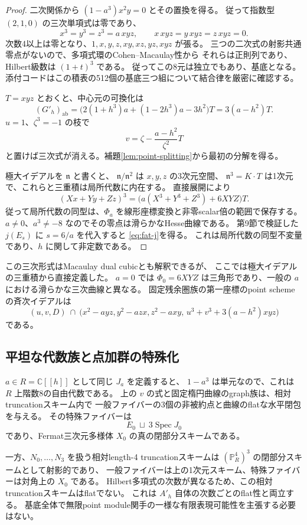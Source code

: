 \documentclass[a4paper,11pt]{ltjsarticle}
\theoremstyle{definition}
\newcommand{\CC}{\mathbb C}
\newcommand{\PP}{\mathbb P}
\begin{document}
\begin{proof}
二次関係から $(1-a^3)x^2y=0$ とその置換を得る。
従って指数型 $(2,1,0)$ の三次単項式は零であり、
\[
 x^3=y^3=z^3=a\,xyz,\qquad
 x\,xyz=y\,xyz=z\,xyz=0.
\]
次数4以上は零となり、$1,x,y,z,xy,xz,yz,xyz$ が張る。
三つの二次式の射影共通零点がないので、多項式環のCohen--Macaulay性から
それらは正則列であり、Hilbert級数は $(1+t)^3$ である。
従ってこの8元は独立でもあり、基底となる。
添付コードはこの積表の512個の基底三つ組について結合律を厳密に確認する。

$T=xyz$ とおくと、中心元の可換化は
\[
 (G'_h)_{\mathrm{ab}}
 =\bigl(2(1+h^3)a+(1-2h^3)a-3h^2\bigr)T
 =3(a-h^2)T.
\]
$u=1$、$\zeta^3=-1$ の枝で
\[
 v=\zeta-\frac{a-h^2}{\zeta^2}T
\]
と置けば三次式が消える。補題\ref{lem:point-splitting}から最初の分解を得る。

極大イデアルを $\mathfrak n$ と書くと、
$\mathfrak n/\mathfrak n^2$ は $x,y,z$ の3次元空間、
$\mathfrak n^3=K\cdot T$ は1次元で、これらと三重積は局所代数に内在する。
直接展開により
\[
 (Xx+Yy+Zz)^3
 =\bigl(a(X^3+Y^3+Z^3)+6XYZ\bigr)T.
\]
従って局所代数の同型は、$\Phi_a$ を線形座標変換と非零scalar倍の範囲で保存する。
$a\ne0$、$a^3\ne-8$ なのでその零点は滑らかなHesse曲線である。
第9節で検証した $j(E_s)$ に $s=6/a$ を代入すると
\eqref{eq:fat-j}を得る。
これは局所代数の同型不変量であり、$h$ に関して非定数である。
\end{proof}

この三次形式はMacaulay dual cubicとも解釈できるが、
ここでは極大イデアルの三重積から直接定義した。
$a=0$ では $\Phi_0=6XYZ$ は三角形であり、一般の $a$ における滑らかな三次曲線と異なる。
固定残余圏族の第一座標のpoint schemeの斉次イデアルは
\[
 (u,v,D)\ \cap\
 \bigl(x^2-a yz,y^2-a zx,z^2-a xy,\,
 u^3+v^3+3(a-h^2)xyz\bigr)
\]
である。

\subsection{平坦な代数族と点加群の特殊化}

$a\in R=\CC[[h]]$ として同じ $J_a$ を定義すると、
$1-a^3$ は単元なので、これは $R$ 上階数8の自由代数である。
上の $v$ の式と固定楕円曲線のgraph族は、相対truncationスキーム内で
一般ファイバーの3個の非被約点と曲線のflatな水平閉包を与える。
その特殊ファイバーは
\[
 E_0\ \sqcup\ 3\operatorname{Spec}J_0
\]
であり、Fermat三次元多様体 $X_0$ の真の閉部分スキームである。

一方、$N_0,\ldots,N_3$ を扱う相対length-4 truncationスキームは
$(\PP^4_R)^3$ の閉部分スキームとして射影的であり、
一般ファイバーは上の1次元スキーム、特殊ファイバーは対角上の $X_0$ である。
Hilbert多項式の次数が異なるため、この相対truncationスキームはflatでない。
これは $A'_h$ 自体の次数ごとのflat性と両立する。
基底全体で無限point module関手の一様な有限表現可能性を主張する必要はない。
\end{document}
